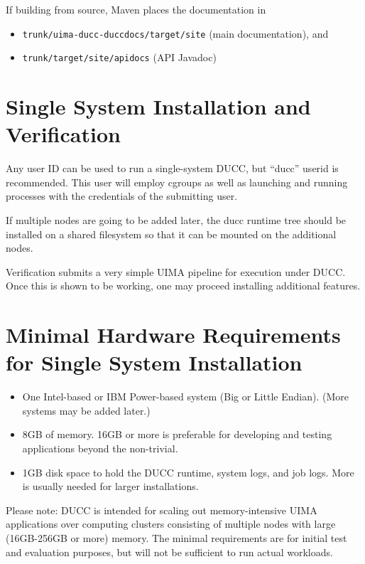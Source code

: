 If building from source, Maven places the documentation in
\begin{itemize}
    \item {\tt trunk/uima-ducc-duccdocs/target/site} (main documentation), and 
    \item {\tt trunk/target/site/apidocs} (API Javadoc)
\end{itemize}

\section{Single System Installation and Verification}

Any user ID can be used to run a single-system DUCC, but ``ducc'' userid is recommended.
This user will employ cgroups as well as launching and running processes with the credentials of the submitting user.

If multiple nodes are going to be added later, the ducc runtime tree should be installed
on a shared filesystem so that it can be mounted on the additional nodes.

Verification submits a very simple UIMA pipeline for execution under DUCC.  Once this is shown to be
working, one may proceed installing additional features.


\section{Minimal Hardware Requirements for Single System Installation}
\begin{itemize}
    \item One Intel-based or IBM Power-based system (Big or Little Endian).  (More systems may be added later.)

    \item 8GB of memory.  16GB or more is preferable for developing and testing applications beyond
      the non-trivial.  

    \item 1GB disk space to hold the DUCC runtime, system logs, and job logs.  More is
      usually needed for larger installations.  
\end{itemize}

Please note: DUCC is intended for scaling out memory-intensive UIMA applications over computing
clusters consisting of multiple nodes with large (16GB-256GB or more) memory.  The minimal
requirements are for initial test and evaluation purposes, but will not be sufficient to run actual
workloads.


